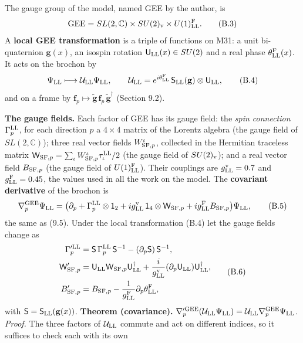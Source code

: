 \documentclass[
  10pt,
]{article}
\begin{document}
The gauge group of the model, named GEE by the author, is
\[\mathrm{GEE}=SL(2,\mathbb C)\times SU(2)_{\rm v}\times U(1)^{\rm F}_{\rm LL}.\tag{B.3}\]
A \textbf{local GEE transformation} is a triple of functions on M31: a
unit bi-quaternion \(\mathbf g(x)\), an isospin rotation
\(\mathsf U_{\rm LL}(x)\in SU(2)\) and a real phase
\(\theta^{\rm F}_{\rm LL}(x)\). It acts on the brochon by
\[\Psi_{\rm LL}\longmapsto\mathcal U_{\rm LL}\Psi_{\rm LL},\qquad\mathcal U_{\rm LL}=e^{i\theta^{\rm F}_{\rm LL}}\,\mathsf S_{\rm LL}(\mathbf g)\otimes\mathsf U_{\rm LL},\tag{B.4}\]
and on a frame by
\(\mathbf f_p\mapsto\tilde{\mathbf g}\,\mathbf f_p\,\tilde{\mathbf g}^\dagger\)
(Section 9.2).

\textbf{The gauge fields.} Each factor of GEE has its gauge field: the
\emph{spin connection} \(\Gamma^{\rm LL}_p\), for each direction \(p\) a
\(4\times4\) matrix of the Lorentz algebra (the gauge field of
\(SL(2,\mathbb C)\)); three real vector fields \(W^\iota_{{\rm SF},p}\),
collected in the Hermitian traceless matrix
\(\mathsf W_{{\rm SF},p}=\sum_\iota W^\iota_{{\rm SF},p}\tau^{\rm LL}_\iota/2\)
(the gauge field of \(SU(2)_{\rm v}\)); and a real vector field
\(B_{{\rm SF},p}\) (the gauge field of \(U(1)^{\rm F}_{\rm LL}\)). Their
couplings are \(g^{\rm v}_{\rm LL}=0.7\) and
\(g^{\rm F}_{\rm LL}=0.45\), the values used in all the work on the
model. The \textbf{covariant derivative} of the brochon is
\[\nabla^{\rm GEE}_p\Psi_{\rm LL}=\big(\partial_p+\Gamma^{\rm LL}_p\otimes\mathsf 1_2+ig^{\rm v}_{\rm LL}\,\mathsf 1_4\otimes\mathsf W_{{\rm SF},p}+ig^{\rm F}_{\rm LL}B_{{\rm SF},p}\big)\Psi_{\rm LL},\tag{B.5}\]
the same as (9.5). Under the local transformation (B.4) let the gauge
fields change as
\[\begin{aligned}\Gamma'^{\rm LL}_p&=\mathsf S\,\Gamma^{\rm LL}_p\,\mathsf S^{-1}-(\partial_p\mathsf S)\,\mathsf S^{-1},\\\mathsf W'_{{\rm SF},p}&=\mathsf U_{\rm LL}\mathsf W_{{\rm SF},p}\mathsf U_{\rm LL}^\dagger+\frac i{g^{\rm v}_{\rm LL}}(\partial_p\mathsf U_{\rm LL})\mathsf U_{\rm LL}^\dagger,\\B'_{{\rm SF},p}&=B_{{\rm SF},p}-\frac1{g^{\rm F}_{\rm LL}}\partial_p\theta^{\rm F}_{\rm LL},\end{aligned}\tag{B.6}\]
with \(\mathsf S=\mathsf S_{\rm LL}(\mathbf g(x))\). \textbf{Theorem
(covariance).}
\(\nabla'^{\rm GEE}_p(\mathcal U_{\rm LL}\Psi_{\rm LL})=\mathcal U_{\rm LL}\nabla^{\rm GEE}_p\Psi_{\rm LL}\).
\emph{Proof.} The three factors of \(\mathcal U_{\rm LL}\) commute and
act on different indices, so it suffices to check each with its own
\end{document}
